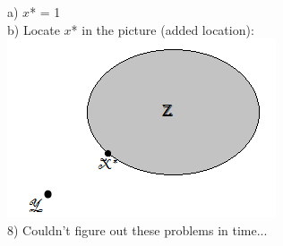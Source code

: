\documentclass [12pt] {article}
\begin{document}
a) $x$* = 1\\

b) Locate $x$* in the picture (added location):\\

\includegraphics{Euclidean}\\

8) Couldn't figure out these problems in time...
\end{document}
